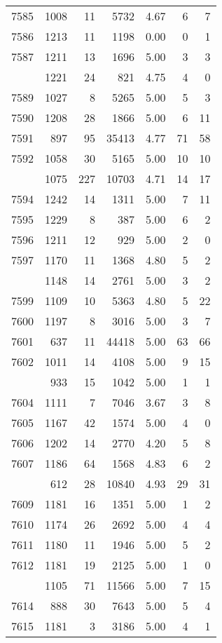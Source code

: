 \documentclass[
]{article}
\begin{document}
\begin{table}
\begin{tabular}[t]{lrrrrrr}
7585 & 1008 & 11 & 5732 & 4.67 & 6 & 7\\
7586 & 1213 & 11 & 1198 & 0.00 & 0 & 1\\
7587 & 1211 & 13 & 1696 & 5.00 & 3 & 3\\
\addlinespace
7588 & 1221 & 24 & 821 & 4.75 & 4 & 0\\
7589 & 1027 & 8 & 5265 & 5.00 & 5 & 3\\
7590 & 1208 & 28 & 1866 & 5.00 & 6 & 11\\
7591 & 897 & 95 & 35413 & 4.77 & 71 & 58\\
7592 & 1058 & 30 & 5165 & 5.00 & 10 & 10\\
\addlinespace
7593 & 1075 & 227 & 10703 & 4.71 & 14 & 17\\
7594 & 1242 & 14 & 1311 & 5.00 & 7 & 11\\
7595 & 1229 & 8 & 387 & 5.00 & 6 & 2\\
7596 & 1211 & 12 & 929 & 5.00 & 2 & 0\\
7597 & 1170 & 11 & 1368 & 4.80 & 5 & 2\\
\addlinespace
7598 & 1148 & 14 & 2761 & 5.00 & 3 & 2\\
7599 & 1109 & 10 & 5363 & 4.80 & 5 & 22\\
7600 & 1197 & 8 & 3016 & 5.00 & 3 & 7\\
7601 & 637 & 11 & 44418 & 5.00 & 63 & 66\\
7602 & 1011 & 14 & 4108 & 5.00 & 9 & 15\\
\addlinespace
7603 & 933 & 15 & 1042 & 5.00 & 1 & 1\\
7604 & 1111 & 7 & 7046 & 3.67 & 3 & 8\\
7605 & 1167 & 42 & 1574 & 5.00 & 4 & 0\\
7606 & 1202 & 14 & 2770 & 4.20 & 5 & 8\\
7607 & 1186 & 64 & 1568 & 4.83 & 6 & 2\\
\addlinespace
7608 & 612 & 28 & 10840 & 4.93 & 29 & 31\\
7609 & 1181 & 16 & 1351 & 5.00 & 1 & 2\\
7610 & 1174 & 26 & 2692 & 5.00 & 4 & 4\\
7611 & 1180 & 11 & 1946 & 5.00 & 5 & 2\\
7612 & 1181 & 19 & 2125 & 5.00 & 1 & 0\\
\addlinespace
7613 & 1105 & 71 & 11566 & 5.00 & 7 & 15\\
7614 & 888 & 30 & 7643 & 5.00 & 5 & 4\\
7615 & 1181 & 3 & 3186 & 5.00 & 4 & 1\\

\end{tabular}
\end{table}
\end{document}
